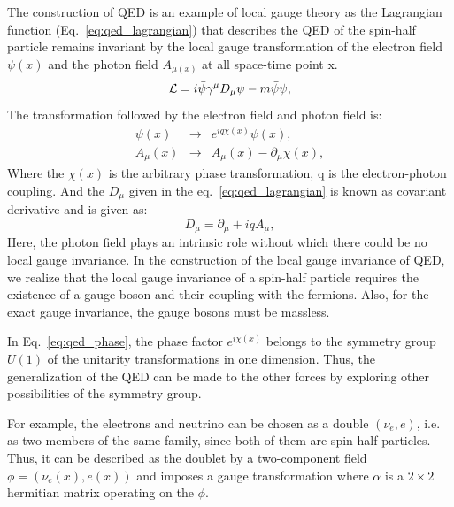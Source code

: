 The construction of QED is an example of local gauge theory as the Lagrangian function (Eq.~\ref{eq:qed_lagrangian}) that describes the QED of the spin-half particle remains invariant by the local gauge transformation of the electron field $\psi(x)$ and the photon field $A_{\mu(x)}$ at all space-time point x.
\begin{equation}\label{eq:qed_lagrangian}
    \mathcal{L} = i \bar{\psi}\gamma^{\mu} D_{\mu}\psi - m\bar{\psi}\psi,
\end{equation}
The transformation followed by the electron field and photon field is:
\begin{eqnarray}\label{eq:qed_phase}
    \psi(x) & \rightarrow & e^{iq\chi(x)}\psi(x), \nonumber \\
    A_\mu(x) & \rightarrow & A_\mu(x) - {\partial_\mu \chi(x)}, 
\end{eqnarray}
Where the $\chi(x)$ is the arbitrary phase transformation, q is the electron-photon coupling.
And the $D_{\mu}$ given in the eq.~\ref{eq:qed_lagrangian} is known as covariant derivative and is given as:
\begin{equation}
    D_{\mu} = \partial_{\mu} + iqA_{\mu},
\end{equation}
Here, the photon field plays an intrinsic role without which there could be no local gauge invariance. In the construction of the local gauge invariance of QED, we realize that the local gauge invariance of a spin-half particle requires the existence of a gauge boson and their coupling with the fermions. Also, for the exact gauge invariance, the gauge bosons must be massless. 

In Eq.~\ref{eq:qed_phase}, the phase factor $e^{i\chi(x)}$ belongs to the symmetry group $U(1)$ of the unitarity transformations in one dimension. Thus, the generalization of the QED can be made to the other forces by exploring other possibilities of the symmetry group.

For example, the electrons and neutrino can be chosen as a double $(\nu_e,e)$, i.e. as two members of the same family, since both of them are spin-half particles.
Thus, it can be described as the doublet by a two-component field $\phi = (\nu_e(x),e(x))$ and imposes a gauge transformation where $\alpha$ is a $2\times 2$ hermitian matrix operating on the $\phi$.

